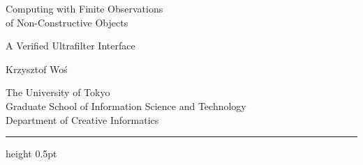 \documentclass[11pt,a4paper]{article}
\theoremstyle{result}
\theoremstyle{definition}
\begin{document}
\thispagestyle{plain}

\begin{flushleft}
  {\fontsize{23}{27}\selectfont\color{ink}
    Computing with Finite Observations\\
    of Non-Constructive Objects\par}
  \vspace{7pt}
  {\Large\sffamily\color{muted}A Verified Ultrafilter Interface\par}
  \vspace{18pt}
  {\large Krzysztof Wo\'s\par}
  \vspace{4pt}
  {\small\color{muted}The University of Tokyo\\
    Graduate School of Information Science and Technology\\
    Department of Creative Informatics\par}
\end{flushleft}
\vspace{6pt}
{\color{rulegray}\hrule height 0.5pt}
\vspace{12pt}
\end{document}
